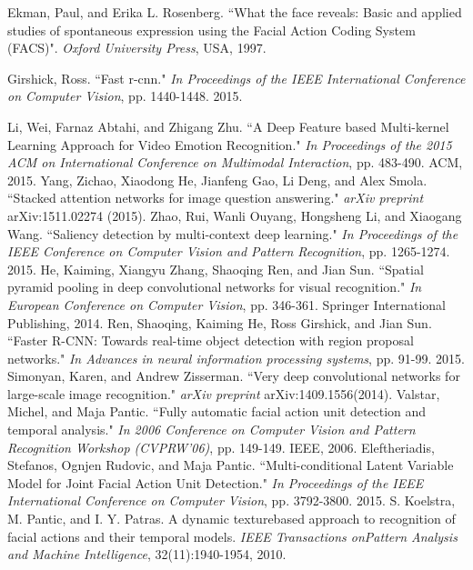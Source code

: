 \documentclass[a4paper, 10pt, conference]{ieeeconf}      %
\begin{document}
\begin{thebibliography}{99}

Ekman, Paul, and Erika L. Rosenberg. ``What the face reveals: Basic and applied studies of spontaneous expression using the Facial Action Coding System (FACS)". {\it Oxford University Press}, USA, 1997.

Girshick, Ross. ``Fast r-cnn." {\it In Proceedings of the IEEE International Conference on Computer Vision}, pp. 1440-1448. 2015.

Li, Wei, Farnaz Abtahi, and Zhigang Zhu. ``A Deep Feature based Multi-kernel Learning Approach for Video Emotion Recognition." {\it In Proceedings of the 2015 ACM on International Conference on Multimodal Interaction}, pp. 483-490. ACM, 2015.
Yang, Zichao, Xiaodong He, Jianfeng Gao, Li Deng, and Alex Smola. ``Stacked attention networks for image question answering." {\it arXiv preprint} arXiv:1511.02274 (2015).
Zhao, Rui, Wanli Ouyang, Hongsheng Li, and Xiaogang Wang. ``Saliency detection by multi-context deep learning." {\it In Proceedings of the IEEE Conference on Computer Vision and Pattern Recognition}, pp. 1265-1274. 2015.
He, Kaiming, Xiangyu Zhang, Shaoqing Ren, and Jian Sun. ``Spatial pyramid pooling in deep convolutional networks for visual recognition." {\it In European Conference on Computer Vision}, pp. 346-361. Springer International Publishing, 2014.
Ren, Shaoqing, Kaiming He, Ross Girshick, and Jian Sun. ``Faster R-CNN: Towards real-time object detection with region proposal networks." {\it In Advances in neural information processing systems}, pp. 91-99. 2015.
Simonyan, Karen, and Andrew Zisserman. ``Very deep convolutional networks for large-scale image recognition." {\it arXiv preprint} arXiv:1409.1556(2014).
Valstar, Michel, and Maja Pantic. ``Fully automatic facial action unit detection and temporal analysis." {\it In 2006 Conference on Computer Vision and Pattern Recognition Workshop (CVPRW'06)}, pp. 149-149. IEEE, 2006.
Eleftheriadis, Stefanos, Ognjen Rudovic, and Maja Pantic. ``Multi-conditional Latent Variable Model for Joint Facial Action Unit Detection." {\it In Proceedings of the IEEE International Conference on Computer Vision}, pp. 3792-3800. 2015.
S. Koelstra, M. Pantic, and I. Y. Patras. A dynamic texturebased approach to recognition of facial actions and their temporal models. {\it IEEE Transactions onPattern Analysis and Machine Intelligence}, 32(11):1940-1954, 2010.

\end{thebibliography}
\end{document}

